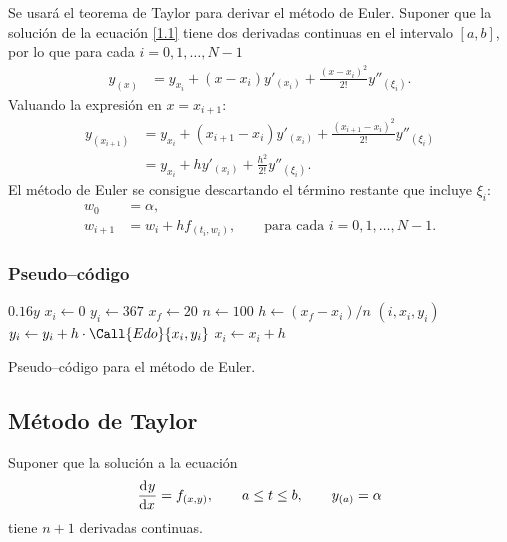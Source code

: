 \documentclass[
    english, spanish, Ce-table, Ce-theorem
]{CabesHW}
\begin{document}
Se usará el teorema de Taylor para derivar el método de Euler. Suponer que la solución de la ecuación  \eqref{1.1} tiene dos derivadas continuas en el intervalo $[a, b]$, por lo que para cada $i = 0, 1, \ldots, N-1$
\begin{align*}
     y_{(x)} &= y_{x_i} + (x-x_i)y'_{(x_i)} + \frac{(x-x_i)^2}{2!}y''_{(\xi_i)}.
\end{align*} 
Valuando la expresión en $x=x_{i+1}$:
\begin{align*}
     y_{(x_{i+1})} &= y_{x_i} + (x_{i+1}-x_i)y'_{(x_i)} + \frac{(x_{i+1}-x_i)^2}{2!}y''_{(\xi_i)}\\
     &= y_{x_i} + hy'_{(x_i)} + \frac{h^2}{2!}y''_{(\xi_i)}.
\end{align*}
El método de Euler se consigue descartando el término restante que incluye $\xi_i$:
\begin{align*}
    w_0 &= \alpha,\\
    w_{i+1} &= w_i + h f_{(t_i, w_i)}, \qquad \text{para cada $i = 0, 1, \ldots, N-1$}.
\end{align*}

\subsubsection{Pseudo--código}
\begin{algorithm}[H]
    \centering
    \begin{myalg}[1]
        \State \Output $0.16 y$
    \EndFunction
    \State \phantom{}
    \State $x_i \gets 0$ 
    \State $y_i \gets 367$ 
    \State $x_f \gets 20$ 
    \State $n \gets 100$ 
    \State \phantom{}
    \State $h \gets (x_f - x_i)/n$ 
        \State \Output $(i, x_i, y_i)$
        \State \phantom{}
        \State $y_i \gets y_i + h\cdot\Call{Edo}{x_i, y_i}$
        \State $x_i \gets x_i + h$
    \EndFor
    \end{myalg}
    \caption{Pseudo--código para el método de Euler.}
    \label{alg:euler}
\end{algorithm}

\vspace{1em}
\subsection{Método de Taylor}
Suponer que la solución a la ecuación
\[ \td{y}{x} = f_{(x,y)}, \qquad a \leq t \leq b, \qquad y_{(a)} = \alpha \]
tiene $n+1$ derivadas continuas.
\end{document}
